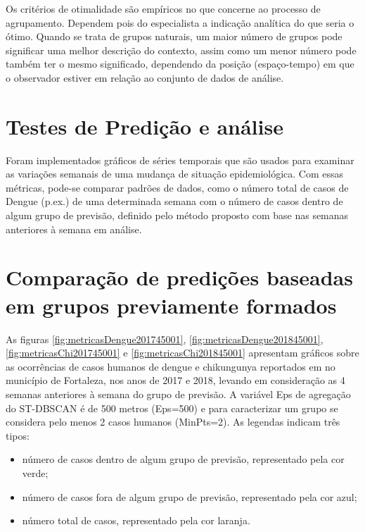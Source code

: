Os critérios de otimalidade são empíricos no que concerne ao processo de agrupamento. Dependem pois do especialista a indicação analítica do que seria o ótimo. Quando se trata de grupos naturais, um maior número de grupos pode significar uma melhor descrição do contexto, assim como um menor número pode também ter o mesmo significado, dependendo da posição (espaço-tempo) em que o observador estiver em relação ao conjunto de dados de análise.

\section{Testes de Predição e análise}

Foram implementados gráficos de séries temporais que são usados para examinar as variações semanais de uma mudança de situação epidemiológica. Com essas métricas, pode-se comparar padrões de dados, como o número total de casos de Dengue (p.ex.) de uma determinada semana com o número de casos dentro de algum grupo de previsão, definido pelo método proposto com base nas semanas anteriores à semana em análise.

\section{Comparação de predições baseadas em grupos previamente formados}

As figuras \ref{fig:metricasDengue201745001}, \ref{fig:metricasDengue201845001}, \ref{fig:metricasChi201745001} e \ref{fig:metricasChi201845001} apresentam gráficos sobre as ocorrências de casos humanos de dengue e chikungunya reportados em \cite{simda} no município de Fortaleza, nos anos de 2017 e 2018, levando em consideração as 4 semanas anteriores à semana do grupo de previsão. A variável Eps de agregação do ST-DBSCAN é de 500 metros (Eps=500) e para caracterizar um grupo se considera pelo menos 2 casos humanos (MinPts=2).
As legendas indicam três tipos:
\begin{itemize}
    \item número de casos dentro de algum grupo de previsão, representado pela cor verde;
    \item número de casos fora de algum grupo de previsão, representado pela cor azul;
    \item número total de casos, representado pela cor laranja.
\end{itemize}


